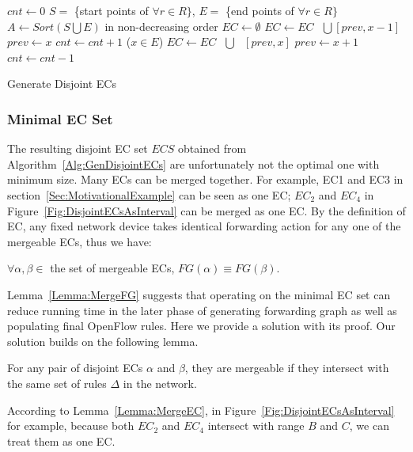 \begin{algorithm}[t]
\DontPrintSemicolon
{}
$cnt \gets 0$\;
$S = $ \{start points of $\forall r \in R\}$, $E = $ \{end points of $\forall r \in R\}$\;
$A \gets Sort(S \bigcup E)$ in non-decreasing order\;
$EC \gets \emptyset$\;
 {
         {
                 {\label{Alg:LineEndStart1} 
                        $EC \gets EC \text{ }\bigcup \text{} [prev, x-1]$\;
                }\label{Alg:LineEndStart2} 
                $prev \gets x$\;\label{Alg:LineNewPrev1}
                $cnt \gets cnt + 1$\;
        }
        \Else ($x \in E$) {
                $EC \gets EC \text{ } \bigcup \text{ } [prev, x]$\;\label{Alg:LineEndEnd}
                $prev \gets x + 1$\;\label{Alg:LineNewPrev2}
                $cnt \gets cnt - 1$\;
        }
}
\caption{Generate Disjoint ECs\label{Alg:GenDisjointECs}}
\end{algorithm}

\subsubsection{Minimal EC Set}
The resulting disjoint EC set $ECS$ obtained from Algorithm~\ref{Alg:GenDisjointECs} are unfortunately not the optimal one with minimum size.
Many ECs can be merged together.
For example, EC1 and EC3 in section~\ref{Sec:MotivationalExample} can be seen as one EC;
$EC_2$ and $EC_4$ in Figure~\ref{Fig:DisjointECsAsInterval} can be merged as one EC.
By the definition of EC, any fixed network device takes identical forwarding action
for any one of the mergeable ECs, thus we have:
\begin{lemma}
$\forall \alpha, \beta \in$ the set of mergeable ECs, $FG(\alpha) \equiv FG(\beta)$.
\label{Lemma:MergeFG}
\end{lemma}
Lemma~\ref{Lemma:MergeFG} suggests that operating on the minimal EC set can
reduce running time in the later phase of generating forwarding graph
as well as populating final OpenFlow rules.
Here we provide a solution with its proof.
Our solution builds on the following lemma.
\begin{lemma}
For any pair of disjoint ECs $\alpha$ and $\beta$, they are mergeable
if they intersect with the same set of rules $\Delta$ in the network.
\label{Lemma:MergeEC}
\end{lemma}
According to Lemma~\ref{Lemma:MergeEC}, in Figure~\ref{Fig:DisjointECsAsInterval} for example,
because both $EC_2$ and $EC_4$ intersect with range $B$ and $C$, we can treat them as one EC.

